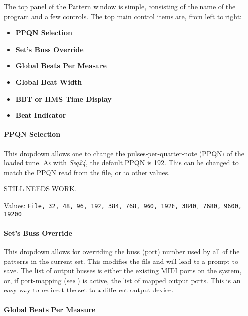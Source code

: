 \documentclass[
 11pt,
 twoside,
 a4paper,
 headinclude,
 footinclude,
 final                                 %
]{article}
\begin{document}
   The top panel of the Pattern window is simple, consisting of the
   name of the program and a few controls.
   The top main control items are, from left to right:

   \begin{itemize}
      \item \textbf{PPQN Selection}
      \item \textbf{Set's Buss Override}
      \item \textbf{Global Beats Per Measure}
      \item \textbf{Global Beat Width}
      \item \textbf{BBT or HMS Time Display}
      \item \textbf{Beat Indicator}
   \end{itemize}


\paragraph{PPQN Selection}
\label{paragraph:introduction_ppqn_selection}

   This dropdown allows one to change the pulses-per-quarter-note (PPQN) of the
   loaded tune.
   As with \textsl{Seq24}, the default PPQN is 192.  This can be changed to
   match the PPQN read from the file, or to other values.

   STILL NEEDS WORK.

   Values:
      \texttt{File, 32, 48, 96, 192, 384, 768, 960, 1920, 3840, 7680, 9600, 19200}

\paragraph{Set's Buss Override}
\label{paragraph:introduction_sets_buss_override}

   This dropdown allows for overriding the buss (port) number used by all of
   the patterns in the current set.  This modifies the file and will lead to a
   prompt to save.
   The list of
   output busses is either the existing MIDI ports on the system, or,
   if port-mapping (see ) is active, the list
   of mapped output ports.
   This is an easy way to redirect the set to a different output device.

\paragraph{Global Beats Per Measure}
\label{paragraph:introduction_global_beats_per_measure}
\end{document}
